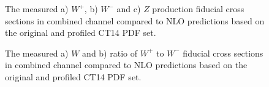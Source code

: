 \begin{figure}[!tbp]
\begin{minipage}[h]{0.32\linewidth}
\end{minipage}
\hfill
\begin{minipage}[h]{0.32\linewidth}
\end{minipage}
\hfill
\begin{minipage}[h]{0.32\linewidth}
\end{minipage}
\caption{The measured a) $W^{+}$,  b) $W^-$ and c) $Z$ production fiducial cross sections in combined channel compared to NLO predictions based on the original and profiled CT14 PDF set.}
\label{fig:PDFEffectXsec}
\end{figure}



\begin{figure}[!tbp]
\begin{minipage}[h]{0.49\linewidth}
\end{minipage}
\begin{minipage}[h]{0.49\linewidth}
\end{minipage}
\caption{The measured a) $W$  and  b) ratio of $W^+$ to $W^-$ fiducial cross sections in combined channel compared to NLO predictions based on the original and profiled CT14 PDF set. }
\label{fig:PDFEffectRatio}
\end{figure}
